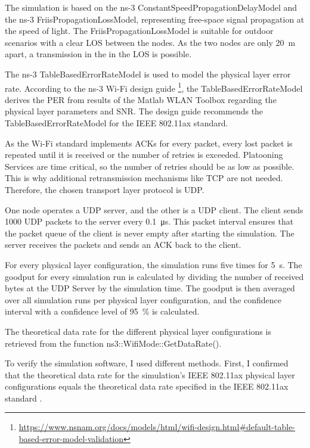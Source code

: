 The simulation is based on the ns-3 ConstantSpeedPropagationDelayModel and the  ns-3 FriisPropagationLossModel,
representing free-space signal propagation at the speed of light.
The FriisPropagationLossModel is suitable for outdoor scenarios with a clear \ac{LOS} between the nodes.
As the two nodes are only \SI{20}{\metre} apart, a transmission in the
in the \ac{LOS} is possible.

The ns-3 TableBasedErrorRateModel is used to model the physical layer error rate.
According to the ns-3 Wi-Fi design guide \footnote{\url{https://www.nsnam.org/docs/models/html/wifi-design.html\#default-table-based-error-model-validation}},
the TableBasedErrorRateModel derives the \ac{PER} from results of the Matlab WLAN Toolbox
regarding the physical layer parameters and \ac{SNR}.
The design guide recommends the TableBasedErrorRateModel for the IEEE 802.11ax standard.

As the Wi-Fi standard implements ACKs for every packet, every lost packet is repeated until it is received or the number of retries is
exceeded.
Platooning Services are time critical, so the number of retries should be as low as possible.
This is why additional retransmission mechanisms like TCP are not needed.
Therefore, the chosen transport layer protocol is UDP.

One node operates a \ac{UDP} server, and the other is a \ac{UDP} client.
The client sends \SI{1000}{\byte} \ac{UDP} packets to the server every \SI{0.1}{\micro\second}.
This packet interval
ensures that the packet queue of the client is never empty after starting the simulation.
The server receives the packets and sends an ACK back to the client.

For every physical layer configuration, the simulation runs five times for \SI{5}{\second}.
The goodput for every simulation run is calculated by dividing the number of received bytes at the \ac{UDP} Server by the simulation time.
The goodput is then averaged over all simulation runs per physical layer configuration, and the confidence interval with a confidence level of
\SI{95}{\percent} is calculated.

The theoretical data rate for the different physical layer configurations is retrieved from the function ns3::WifiMode::GetDataRate().

To verify the simulation software, I used different methods.
First, I confirmed that the theoretical data rate for the simulation's IEEE 802.11ax physical layer configurations equals the theoretical data rate specified in the IEEE 802.11ax standard \cite{ieee_standard_2021ax}.

